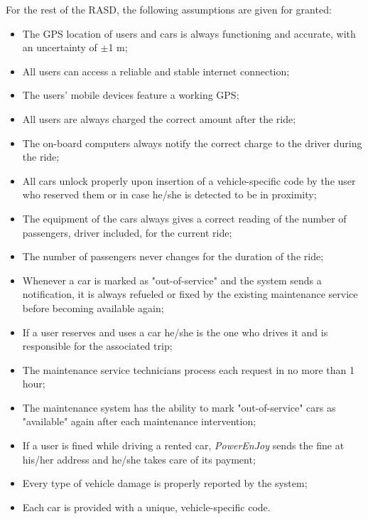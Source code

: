 For the rest of the RASD, the following assumptions are given for granted:

\begin{itemize}
\item The GPS location of users and cars is always functioning and accurate, with an uncertainty of $\pm$1 m; 
\item All users can access a reliable and stable internet connection;
\item The users' mobile devices feature a working GPS;
\item All users are always charged the correct amount after the ride;
\item The on-board computers always notify the correct charge to the driver during the ride;
\item All cars unlock properly upon insertion of a vehicle-specific code by the user who reserved them or in case he/she is detected to be in proximity;
\item The equipment of the cars always gives a correct reading of the number of passengers, driver included, for the current ride;
\item The number of passengers never changes for the duration of the ride;
\item Whenever a car is marked as "out-of-service" and the system sends a notification, it is always refueled or fixed by the existing maintenance service before becoming available again;
\item If a user reserves and uses a car he/she is the one who drives it and is responsible for the associated trip;
\item The maintenance service technicians process each request in no more than 1 hour;
\item The maintenance system has the ability to mark "out-of-service" cars as "available" again after each maintenance intervention;
\item If a user is fined while driving a rented car, \emph{PowerEnJoy} sends the fine at his/her address and he/she takes care of its payment;
\item Every type of vehicle damage is properly reported by the system;
\item Each car is provided with a unique, vehicle-specific code.
\end{itemize}